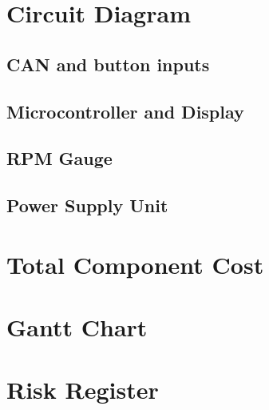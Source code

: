 \documentclass[a4paper,12pt]{article}
\begin{document}
\newpage




\begin{appendices}

\section{Circuit Diagram}
\label{app:circuit_diagram}

\subsection{CAN and button inputs}
\label{app:can}


\subsection{Microcontroller and Display}
\label{app:microcontroller}


\subsection{RPM Gauge}
\label{app:leds}


\subsection{Power Supply Unit}
\label{app:psu}


\section{Total Component Cost}
\label{app:cost}


\section{Gantt Chart}
\label{app:gantt_chart}
\vspace{-2.5cm}


\section{Risk Register}
\label{app:risk_register}


\end{appendices}

\end{document}
